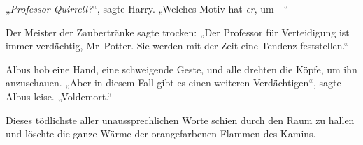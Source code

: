 „\emph{Professor Quirrell?}“, sagte Harry.
„Welches Motiv hat \emph{er}, um—“

Der Meister der Zaubertränke sagte trocken:
„Der Professor für Verteidigung ist immer verdächtig, Mr~Potter. Sie werden mit der Zeit eine Tendenz feststellen.“

Albus hob eine Hand, eine schweigende Geste, und alle drehten die Köpfe, um ihn anzuschauen.
„Aber in diesem Fall gibt es einen weiteren Verdächtigen“, sagte Albus leise.
„Voldemort.“

Dieses tödlichste aller unaussprechlichen Worte schien durch den Raum zu hallen und löschte die ganze Wärme der orangefarbenen Flammen des Kamins.

